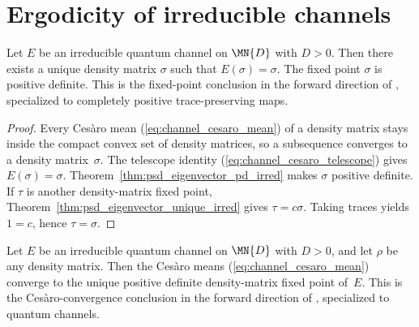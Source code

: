 \section{Ergodicity of irreducible channels}

\begin{theorem}
    \label{thm:channel_density_fp_irred}
    \leanok
    Let $E$ be an irreducible quantum channel on $\MN{D}$ with $D > 0$.
    Then there exists a unique density matrix $\sigma$ such that
    $E(\sigma) = \sigma$.
    The fixed point $\sigma$ is positive definite.
    This is the fixed-point conclusion in the forward direction of
    \cite[Corollary~6.3]{Wolf2012Quantum}, specialized to completely
    positive trace-preserving maps.
\end{theorem}

\begin{proof}
    \leanok
    Every Ces\`aro mean (\ref{eq:channel_cesaro_mean}) of a density matrix
    stays inside the compact convex set of density matrices, so a subsequence
    converges to a density matrix~$\sigma$.  The telescope identity
    (\ref{eq:channel_cesaro_telescope}) gives
    $E(\sigma)=\sigma$.  Theorem~\ref{thm:psd_eigenvector_pd_irred}
    makes $\sigma$ positive definite.  If $\tau$ is another density-matrix
    fixed point, Theorem~\ref{thm:psd_eigenvector_unique_irred} gives
    $\tau=c\sigma$.  Taking traces yields $1=c$, hence $\tau=\sigma$.
\end{proof}

\begin{theorem}
    \label{thm:channel_cesaro_irred}
    \leanok
    Let $E$ be an irreducible quantum channel on $\MN{D}$ with $D > 0$,
    and let $\rho$ be any density matrix.
    Then the Ces\`aro means (\ref{eq:channel_cesaro_mean}) converge to the
    unique positive definite density-matrix fixed point of~$E$.
    This is the Ces\`aro-convergence conclusion in the forward direction of
    \cite[Corollary~6.3]{Wolf2012Quantum}, specialized to quantum channels.
\end{theorem}

